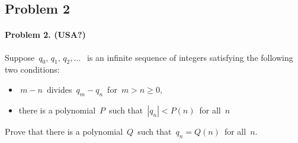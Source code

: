 \documentclass[12pt]{article}
\begin{document}
\subsection*{Problem 2}

\paragraph*{\textbf{Problem 2. (USA?)}} Suppose $\, q_{0}, \, q_{1}, \, q_{2}, \ldots \; \,$ is an infinite sequence of integers satisfying the following two conditions:
\begin{itemize}
    \item $\, m-n \,$ divides $\, q_{m}-q_{n}\,$ for $\, m > n \geq 0,$
    \item there is a polynomial $\, P \,$ such that $\, |q_{n}| < P(n) \,$ for all $\, n$
\end{itemize}

Prove that there is a polynomial $\, Q \,$ such that $\, q_{n}= Q(n) \,$ for all $\, n$.
\end{document}
